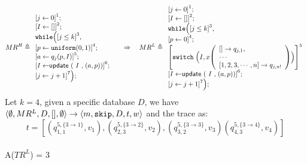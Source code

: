 \documentclass[a4paper,11pt]{article}
\begin{document}
\begin{example}
\[
MR^H \triangleq
\begin{array}{l}
     \left[j \leftarrow 0 \right]^1 ; \\
    \left[I \leftarrow [] \right]^2; \\
    \ewhile \Big( 
    \left[j \leq k \right]^3 , \\
    \left[p \leftarrow \uniform(0,1) \right]^4 ; \\
    \left[a \leftarrow q_j(p, I) \right]^5; \\
    \left[I \leftarrow \eupdt(I, (a, p))  \right]^6;\\
    \left[j \leftarrow j + 1 \right]^7
    \Big) ;
\end{array}
%
~~~~ \Rightarrow ~~~
%
MR^L \triangleq
\begin{array}{l}
     \left[j \leftarrow 0 \right]^1 ; \\
    \left[I \leftarrow [] \right]^2; \\
    \ewhile \Big( 
    \left[j \leq k \right]^3 , \\
    \left[p \leftarrow 0 \right]^4 ; \\
    \left[
    \eswitch \Big( I, x
    \left(\begin{array}{l}
        [ ] \to q_{j,1},\\
        \cdots\\
    \clabel{1, 2, 3, \cdots, n} \to q_{j,n!}
    \end{array}\right)
    \Big)
    \right]^5\\
    \clabel{I \leftarrow \eupdt(I, (a, p))}^6;\\
    \clabel{j \leftarrow j + 1 }^7
    \Big) ;
\end{array}
\]
%
%
Let $k = 4$, given a specific database $D$, we have $\langle \emptyset, MR^L, D, [],\emptyset \rangle \rightarrow \langle m, \mathtt{skip}, D, t, w  \rangle $ and the trace as:
%
$$t = \left[(q^{5, \{3 \to 1\}}_{1, 1}, v_1), 
(q^{5, \{3 \to 2\}}_{2, 3}, v_2),
(q^{5, \{3 \to 3\}}_{3, 2}, v_3)
(q^{5, \{3 \to 4\}}_{4, 3}, v_4)
\right]$$
\\
A($TR^L$) = 3
\begin{center}
%
\end{center}
\end{example}
\end{document}
